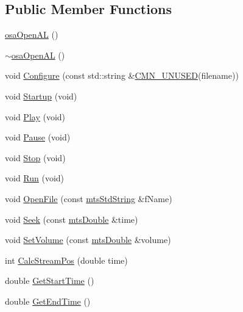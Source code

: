 \subsection*{Public Member Functions}
\begin{DoxyCompactItemize}
\item 
\hyperlink{classosa_open_a_l_a6dcad24149586594c8e0c61e6f0ec3da}{osa\-Open\-A\-L} ()
\item 
\hyperlink{classosa_open_a_l_a9945100e88e0a032d3d7d75e3e7f2489}{$\sim$osa\-Open\-A\-L} ()
\item 
void \hyperlink{classosa_open_a_l_afc5082b0168b07d0476801d1f6cb94cf}{Configure} (const std\-::string \&\hyperlink{cmn_portability_8h_a021894e2626935fa2305434b1e893ff6}{C\-M\-N\-\_\-\-U\-N\-U\-S\-E\-D}(filename))
\item 
void \hyperlink{classosa_open_a_l_ac9437555735a6dbc7503927558b07171}{Startup} (void)
\item 
void \hyperlink{classosa_open_a_l_a7a54efebb58461d129afa38b92040c5b}{Play} (void)
\item 
void \hyperlink{classosa_open_a_l_a900c4a3484d73df01c5d9fcd1ef7fc1b}{Pause} (void)
\item 
void \hyperlink{classosa_open_a_l_a599124840c7c9f602f478eeb6d306907}{Stop} (void)
\item 
void \hyperlink{classosa_open_a_l_a4a84c989bb02d989b834b8d0ac1b4a9c}{Run} (void)
\item 
void \hyperlink{classosa_open_a_l_a861dc93ae29ea94b062f903b8c696354}{Open\-File} (const \hyperlink{mts_generic_object_proxy_8h_adbc21bfbf98367e582bf8a263b7e711f}{mts\-Std\-String} \&f\-Name)
\item 
void \hyperlink{classosa_open_a_l_a971e4d95c754d4a32e32151a08473512}{Seek} (const \hyperlink{mts_generic_object_proxy_8h_a31e76b0190a8d3f9838626cd7b47bd75}{mts\-Double} \&time)
\item 
void \hyperlink{classosa_open_a_l_aa3a4cd3fca80e59381fb7b145e762952}{Set\-Volume} (const \hyperlink{mts_generic_object_proxy_8h_a31e76b0190a8d3f9838626cd7b47bd75}{mts\-Double} \&volume)
\item 
int \hyperlink{classosa_open_a_l_adaacda1e33da3799d8b565e2518a00be}{Calc\-Stream\-Pos} (double time)
\item 
double \hyperlink{classosa_open_a_l_a6db32eb47965e8be33ee3c8dce52f8da}{Get\-Start\-Time} ()
\item 
double \hyperlink{classosa_open_a_l_a2abb80021e9a6a25c6e4ad993174f120}{Get\-End\-Time} ()
\item 

\end{DoxyCompactItemize}
